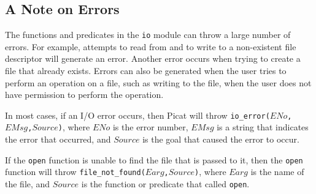 {\subsection{A Note on Errors}
The functions and predicates in the \texttt{io} module can throw a large number of errors.  For example, attempts to read from and to write to a non-existent file descriptor will generate an error.  Another error occurs when trying to create a file that already exists.  Errors can also be generated when the user tries to perform an operation on a file, such as writing to the file, when the user does not have permission to perform the operation.

In most cases, if an I/O error occurs, then Picat will throw \texttt{io\_error($ENo$,$EMsg$,$Source$)}, where $ENo$ is the error number, $EMsg$ is a string that indicates the error that occurred, and $Source$ is the goal that caused the error to occur.  

If the \texttt{open} function is unable to find the file that is passed to it, then the \texttt{open} function will throw \texttt{file\_not\_found($Earg$,$Source$)}, where $Earg$ is the name of the file, and $Source$ is the function or predicate that called \texttt{open}. 
}
\ignore{

}

